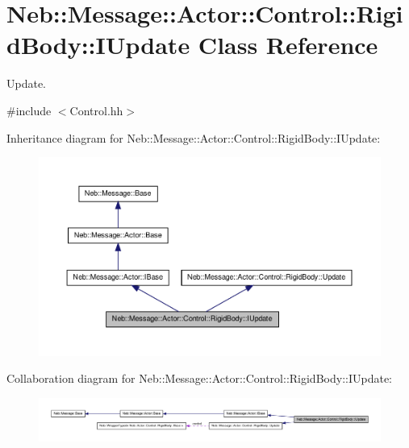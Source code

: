 \hypertarget{classNeb_1_1Message_1_1Actor_1_1Control_1_1RigidBody_1_1IUpdate}{\section{\-Neb\-:\-:\-Message\-:\-:\-Actor\-:\-:\-Control\-:\-:\-Rigid\-Body\-:\-:\-I\-Update \-Class \-Reference}
\label{classNeb_1_1Message_1_1Actor_1_1Control_1_1RigidBody_1_1IUpdate}
}


\-Update.  




{\ttfamily \#include $<$\-Control.\-hh$>$}



\-Inheritance diagram for \-Neb\-:\-:\-Message\-:\-:\-Actor\-:\-:\-Control\-:\-:\-Rigid\-Body\-:\-:\-I\-Update\-:\nopagebreak
\begin{figure}[H]
\begin{center}
\leavevmode
\includegraphics[width=350pt]{classNeb_1_1Message_1_1Actor_1_1Control_1_1RigidBody_1_1IUpdate__inherit__graph}
\end{center}
\end{figure}


\-Collaboration diagram for \-Neb\-:\-:\-Message\-:\-:\-Actor\-:\-:\-Control\-:\-:\-Rigid\-Body\-:\-:\-I\-Update\-:\nopagebreak
\begin{figure}[H]
\begin{center}
\leavevmode
\includegraphics[width=350pt]{classNeb_1_1Message_1_1Actor_1_1Control_1_1RigidBody_1_1IUpdate__coll__graph}
\end{center}
\end{figure}
